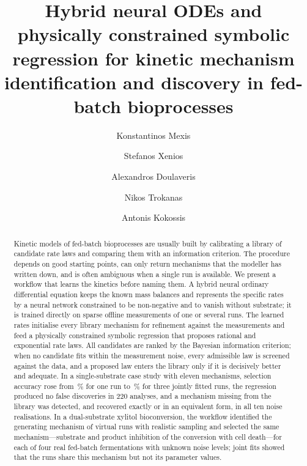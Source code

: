 \documentclass[a4paper,fleqn]{cas-dc}
\begin{document}
\let\WriteBookmarks\relax
\def\floatpagepagefraction{1}
\def\textpagefraction{.001}


\title [mode = title]{Hybrid neural ODEs and physically constrained symbolic regression for kinetic mechanism identification and discovery in fed-batch bioprocesses}

\author[1]{Konstantinos Mexis}
\cormark[1]

\author[1]{Stefanos Xenios}
\author[1]{Alexandros Doulaveris}
\author[1]{Nikos Trokanas}
\author[1]{Antonis Kokossis}



\begin{abstract}
Kinetic models of fed-batch bioprocesses are usually built by calibrating a library of candidate rate laws and comparing them with an information criterion. The procedure depends on good starting points, can only return mechanisms that the modeller has written down, and is often ambiguous when a single run is available. We present a workflow that learns the kinetics before naming them. A hybrid neural ordinary differential equation keeps the known mass balances and represents the specific rates by a neural network constrained to be non-negative and to vanish without substrate; it is trained directly on sparse offline measurements of one or several runs. The learned rates initialise every library mechanism for refinement against the measurements and feed a physically constrained symbolic regression that proposes rational and exponential rate laws. All candidates are ranked by the Bayesian information criterion; when no candidate fits within the measurement noise, every admissible law is screened against the data, and a proposed law enters the library only if it is decisively better and adequate. In a single-substrate case study with eleven mechanisms, selection accuracy rose from \ConeAccSingle\,\% for one run to \ConeAccJoint\,\% for three jointly fitted runs, the regression produced no false discoveries in 220 analyses, and a mechanism missing from the library was detected, and recovered exactly or in an equivalent form, in all ten noise realisations. In a dual-substrate xylitol bioconversion, the workflow identified the generating mechanism of virtual runs with realistic sampling and selected the same mechanism---substrate and product inhibition of the conversion with cell death---for each of four real fed-batch fermentations with unknown noise levels; joint fits showed that the runs share this mechanism but not its parameter values.
\end{abstract}
\end{document}
